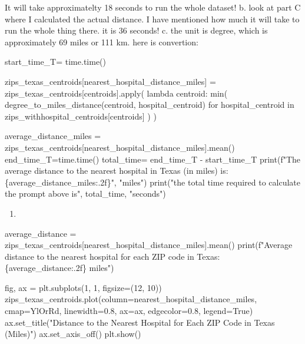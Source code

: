 \documentclass[
  letterpaper,
  DIV=11,
  numbers=noendperiod]{scrartcl}
\newenvironment{Shaded}{\begin{snugshade}}{\end{snugshade}}
\newcommand{\NormalTok}[1]{\textcolor[rgb]{0.00,0.23,0.31}{#1}}
\providecommand{\tightlist}{%
  \setlength{\itemsep}{0pt}\setlength{\parskip}{0pt}}\usepackage{longtable,booktabs,array}
\begin{document}
It will take approximatelty 18 seconds to run the whole dataset! b. look
at part C where I calculated the actual distance. I have mentioned how
much it will take to run the whole thing there. it is 36 seconds! c. the
unit is degree, which is approximately 69 miles or 111 km. here is
convertion:

\begin{Shaded}
\begin{Highlighting}[]
\NormalTok{start\_time\_T= time.time()}

\NormalTok{zips\_texas\_centroids[\textquotesingle{}nearest\_hospital\_distance\_miles\textquotesingle{}] = zips\_texas\_centroids[\textquotesingle{}centroids\textquotesingle{}].apply(}
\NormalTok{    lambda centroid: min(}
\NormalTok{        degree\_to\_miles\_distance(centroid, hospital\_centroid) }
\NormalTok{        for hospital\_centroid in zips\_withhospital\_centroids[\textquotesingle{}centroids\textquotesingle{}]}
\NormalTok{    )}
\NormalTok{)}

\NormalTok{average\_distance\_miles = zips\_texas\_centroids[\textquotesingle{}nearest\_hospital\_distance\_miles\textquotesingle{}].mean()}
\NormalTok{end\_time\_T=time.time()}
\NormalTok{total\_time= end\_time\_T {-} start\_time\_T}
\NormalTok{print(f"The average distance to the nearest hospital in Texas (in miles) is: \{average\_distance\_miles:.2f\}", "miles")}
\NormalTok{print("the total time required to calculate the prompt above is", total\_time, "seconds")}
\end{Highlighting}
\end{Shaded}

\begin{enumerate}
\def\labelenumi{\arabic{enumi}.}
\setcounter{enumi}{4}
\tightlist
\item
\end{enumerate}

\begin{Shaded}
\begin{Highlighting}[]

\NormalTok{average\_distance = zips\_texas\_centroids[\textquotesingle{}nearest\_hospital\_distance\_miles\textquotesingle{}].mean()}
\NormalTok{print(f"Average distance to the nearest hospital for each ZIP code in Texas: \{average\_distance:.2f\} miles")}

\NormalTok{fig, ax = plt.subplots(1, 1, figsize=(12, 10))}
\NormalTok{zips\_texas\_centroids.plot(column=\textquotesingle{}nearest\_hospital\_distance\_miles\textquotesingle{}, cmap=\textquotesingle{}YlOrRd\textquotesingle{}, linewidth=0.8, ax=ax, edgecolor=\textquotesingle{}0.8\textquotesingle{}, legend=True)}
\NormalTok{ax.set\_title("Distance to the Nearest Hospital for Each ZIP Code in Texas (Miles)")}
\NormalTok{ax.set\_axis\_off()}
\NormalTok{plt.show()}
\end{Highlighting}
\end{Shaded}
\end{document}

